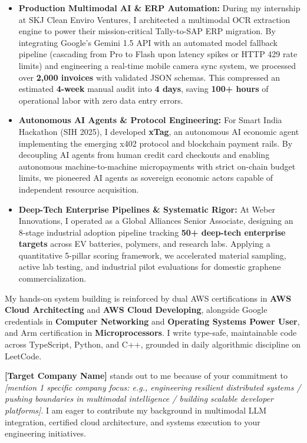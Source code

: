 \documentclass[letterpaper,10pt]{article}
\begin{document}
\begin{itemize}[leftmargin=0.18in, itemsep=3pt, topsep=3pt]
  \item \textbf{Production Multimodal AI \& ERP Automation:} During my internship at SKJ Clean Enviro Ventures, I architected a multimodal OCR extraction engine to power their mission-critical Tally-to-SAP ERP migration. By integrating Google's Gemini 1.5 API with an automated model fallback pipeline (cascading from Pro to Flash upon latency spikes or HTTP 429 rate limits) and engineering a real-time mobile camera sync system, we processed over \textbf{2,000 invoices} with validated JSON schemas. This compressed an estimated \textbf{4-week} manual audit into \textbf{4 days}, saving \textbf{100+ hours} of operational labor with zero data entry errors.

  \item \textbf{Autonomous AI Agents \& Protocol Engineering:} For Smart India Hackathon (SIH 2025), I developed \textbf{xTag}, an autonomous AI economic agent implementing the emerging x402 protocol and blockchain payment rails. By decoupling AI agents from human credit card checkouts and enabling autonomous machine-to-machine micropayments with strict on-chain budget limits, we pioneered AI agents as sovereign economic actors capable of independent resource acquisition.

  \item \textbf{Deep-Tech Enterprise Pipelines \& Systematic Rigor:} At Weber Innovations, I operated as a Global Alliances Senior Associate, designing an 8-stage industrial adoption pipeline tracking \textbf{50+ deep-tech enterprise targets} across EV batteries, polymers, and research labs. Applying a quantitative 5-pillar scoring framework, we accelerated material sampling, active lab testing, and industrial pilot evaluations for domestic graphene commercialization.
\end{itemize}

\vspace{3pt}
My hands-on system building is reinforced by dual AWS certifications in \textbf{AWS Cloud Architecting} and \textbf{AWS Cloud Developing}, alongside Google credentials in \textbf{Computer Networking} and \textbf{Operating Systems Power User}, and Arm certification in \textbf{Microprocessors}. I write type-safe, maintainable code across TypeScript, Python, and C++, grounded in daily algorithmic discipline on LeetCode.

\textbf{[Target Company Name]} stands out to me because of your commitment to \textit{[mention 1 specific company focus: e.g., engineering resilient distributed systems / pushing boundaries in multimodal intelligence / building scalable developer platforms]}. I am eager to contribute my background in multimodal LLM integration, certified cloud architecture, and systems execution to your engineering initiatives.
\end{document}
